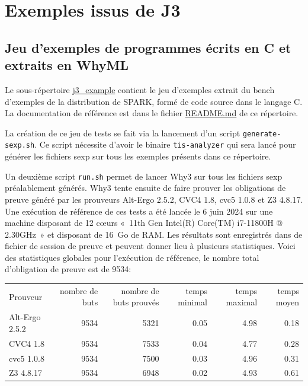 \documentclass[a4paper,11pt]{article}
\begin{document}
\section{Exemples issus de J3}

\subsection{Jeu d'exemples de programmes écrits en C et extraits en WhyML}

Le sous-répertoire \url{j3_example} contient le jeu d'exemples extrait du bench
d'exemples de la distribution de SPARK, formé de code source dans le langage C.
La documentation de référence est dans le fichier \url{README.md} de ce
répertoire.

La création de ce jeu de tests se fait via la lancement d'un script
\verb/generate-sexp.sh/.
Ce script nécessite d'avoir le binaire \verb/tis-analyzer/ qui sera lancé
pour générer les fichiers sexp sur tous les exemples présents dans ce
répertoire.

Un deuxième script \verb/run.sh/ permet de lancer Why3 sur tous les fichiers
sexp préalablement générés. Why3 tente ensuite de faire prouver les obligations
de preuve généré par les prouveurs Alt-Ergo 2.5.2, CVC4 1.8, cvc5 1.0.8 et
Z3 4.8.17. Une exécution de référence de ces tests a été lancée le 6 juin 2024
sur une machine disposant de 12 c{\oe}urs «~11th Gen Intel(R) Core(TM) i7-11800H @ 2.30GHz~» et disposant de 16~Go de RAM.
Les résultats sont enregistrés dans de fichier de session de preuve et peuvent
donner lieu à plusieurs statistiques.
Voici des statistiques globales pour l'exécution de
référence, le nombre total d'obligation de preuve est de 9534:

\begin{center}
  \begin{tabular}{|l|r|r|r|r|r|}
    \hline
  \rowcolor{gray!50} Prouveur
  & \multicolumn{1}{p{0.13\textwidth}|}{nombre de buts}
  & \multicolumn{1}{p{0.13\textwidth}|}{nombre de buts prouvés}
  & \multicolumn{1}{p{0.13\textwidth}|}{temps minimal}
  & \multicolumn{1}{p{0.13\textwidth}|}{temps maximal}
  & \multicolumn{1}{p{0.13\textwidth}|}{temps moyen}
  \\
  Alt-Ergo 2.5.2                &  9534 & 5321 & 0.05 & 4.98 & 0.18 \\
  CVC4 1.8                      &  9534 & 7533 & 0.04 & 4.77 & 0.28 \\
  cvc5 1.0.8                    &  9534 & 7500 & 0.03 & 4.96 & 0.31 \\
  Z3 4.8.17                     &  9534 & 6948 & 0.02 & 4.93 & 0.61 \\
    \hline
\end{tabular}
\end{center}
\end{document}
